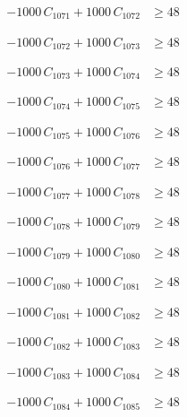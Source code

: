 \documentclass[a4paper,11pt]{article}
\begin{document}
\begin{align}
-1000\,C_{1071} + 1000\,C_{1072} &\geq 48 \nonumber
\end{align}

\begin{align}
-1000\,C_{1072} + 1000\,C_{1073} &\geq 48 \nonumber
\end{align}

\begin{align}
-1000\,C_{1073} + 1000\,C_{1074} &\geq 48 \nonumber
\end{align}

\begin{align}
-1000\,C_{1074} + 1000\,C_{1075} &\geq 48 \nonumber
\end{align}

\begin{align}
-1000\,C_{1075} + 1000\,C_{1076} &\geq 48 \nonumber
\end{align}

\begin{align}
-1000\,C_{1076} + 1000\,C_{1077} &\geq 48 \nonumber
\end{align}

\begin{align}
-1000\,C_{1077} + 1000\,C_{1078} &\geq 48 \nonumber
\end{align}

\begin{align}
-1000\,C_{1078} + 1000\,C_{1079} &\geq 48 \nonumber
\end{align}

\begin{align}
-1000\,C_{1079} + 1000\,C_{1080} &\geq 48 \nonumber
\end{align}

\begin{align}
-1000\,C_{1080} + 1000\,C_{1081} &\geq 48 \nonumber
\end{align}

\begin{align}
-1000\,C_{1081} + 1000\,C_{1082} &\geq 48 \nonumber
\end{align}

\begin{align}
-1000\,C_{1082} + 1000\,C_{1083} &\geq 48 \nonumber
\end{align}

\begin{align}
-1000\,C_{1083} + 1000\,C_{1084} &\geq 48 \nonumber
\end{align}

\begin{align}
-1000\,C_{1084} + 1000\,C_{1085} &\geq 48 \nonumber
\end{align}
\end{document}
